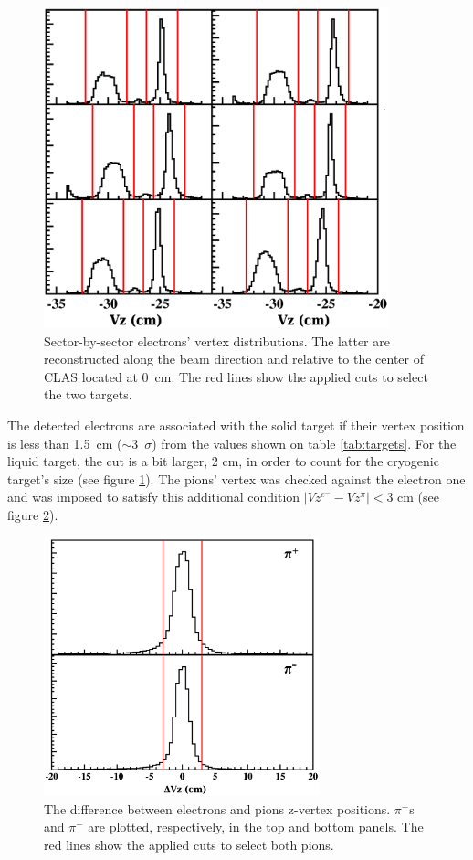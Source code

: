 \begin{figure}[p]
\centering
\includegraphics[width=10cm] {chap5-fig/Vertex_el_data.png}
\caption {Sector-by-sector electrons' vertex distributions. The latter are reconstructed along the beam direction and relative to the center of CLAS located at 0~cm. The red lines show the applied cuts to select the two targets.}
\label{vertex}
\end{figure}

The detected electrons are associated with the solid target if their vertex 
position is less than 1.5~cm ($\sim$3~$\sigma$) from the values shown on table 
\ref{tab:targets}. For the liquid target, the cut is a bit larger, 2 cm, in order to count for the cryogenic target's size (see figure \ref{vertex}). The pions' vertex was checked against the electron one and was imposed to satisfy this additional condition $| Vz^{e^-} - Vz^{\pi} | < 3$ cm (see figure \ref{fig:dvzpi}).

\begin{figure}[tbp]
\centering
\includegraphics[width=8cm] {chap5-fig/Vertex_pi_data.png}
\caption {The difference between electrons and pions z-vertex positions. $\pi^+$s and $\pi^-$ are plotted, respectively, in the top and bottom panels. The red lines show the applied cuts to select both pions.}
\label{fig:dvzpi}
\end{figure}

